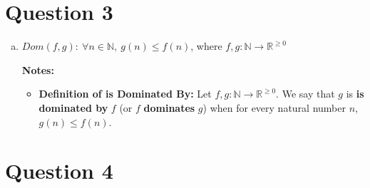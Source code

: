 \documentclass[12pt]{article}
\begin{document}
\section*{Question 3}
\begin{enumerate}[a.]
    \item $Dom(f,g):\:\forall n \in \mathbb{N},\:g(n) \leq f(n)$, where $f,g:\mathbb{N} \to \mathbb{R}^{\geq 0}$

    \bigskip

    \textbf{Notes:}

    \begin{itemize}
        \item \textbf{Definition of is Dominated By:} Let $f,g:\mathbb{N} \to
        \mathbb{R}^{\geq 0}$. We say that $g$ is \textbf{is dominated by} $f$
        (or $f$ \textbf{dominates} $g$) when for every natural number $n$, $g(n) \leq f(n)$.
    \end{itemize}

\end{enumerate}

\section*{Question 4}
\end{document}
